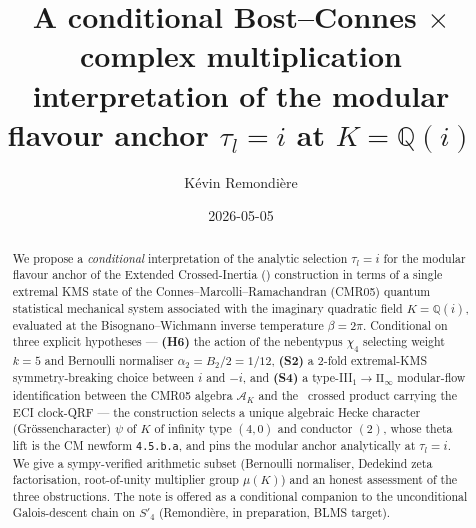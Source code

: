 \documentclass[12pt]{amsart}
\theoremstyle{definition}
\newcommand{\Q}{\mathbb{Q}}
\newcommand{\DEHK}{\mathrm{DEHK}}
\newcommand{\ECI}{\mathrm{ECI}}
\newcommand{\lmfdb}[1]{\texttt{#1}}
\begin{document}
\title[Conditional BC$\times$CM interpretation of $\tau_l=i$]{A
       conditional Bost--Connes $\times$ complex multiplication
       interpretation of the modular flavour anchor $\tau_l = i$
       at $K = \Q(i)$}

\author{K\'evin Remondi\`ere}
\address{Independent researcher}
\date{2026-05-05}


\begin{abstract}
We propose a \emph{conditional} interpretation of the analytic
selection $\tau_l = i$ for the modular flavour anchor of the
Extended Crossed-Inertia (\ECI) construction in terms of a single
extremal KMS state of the Connes--Marcolli--Ramachandran (CMR05)
quantum statistical mechanical system associated with the imaginary
quadratic field $K = \Q(i)$, evaluated at the Bisognano--Wichmann
inverse temperature $\beta = 2\pi$. Conditional on three explicit
hypotheses --- \textbf{(H6)} the action of the nebentypus $\chi_4$
selecting weight $k=5$ and Bernoulli normaliser $\alpha_2 = B_2/2 =
1/12$, \textbf{(S2)} a 2-fold extremal-KMS symmetry-breaking choice
between $i$ and $-i$, and \textbf{(S4)} a type-III${}_1 \to
\mathrm{II}_\infty$ modular-flow identification between the CMR05
algebra $\mathcal{A}_K$ and the \DEHK\ crossed product carrying the
ECI clock-QRF --- the construction selects a unique algebraic Hecke
character (Gr\"ossencharacter) $\psi$ of $K$ of infinity type
$(4,0)$ and conductor $(2)$, whose theta lift is the CM newform
\lmfdb{4.5.b.a}, and pins the modular anchor analytically at $\tau_l
= i$. We give a sympy-verified arithmetic subset (Bernoulli
normaliser, Dedekind zeta factorisation, root-of-unity multiplier
group $\mu(K)$) and an honest assessment of the three obstructions.
The note is offered as a conditional companion to the unconditional
Galois-descent chain on $S'_4$ (Remondi\`ere, in preparation, BLMS
target).
\end{abstract}

\maketitle

\setcounter{tocdepth}{1}
\tableofcontents

\end{document}
